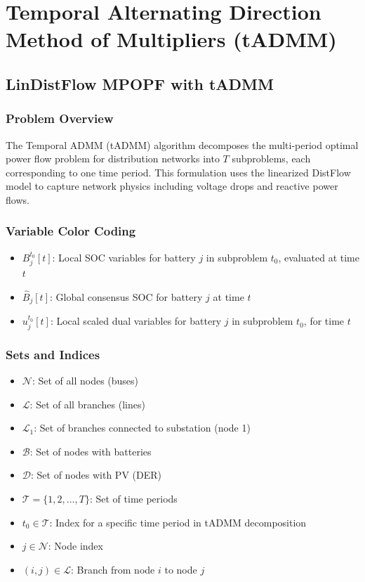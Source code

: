 \clearpage
\section{Temporal Alternating Direction Method of Multipliers (tADMM)}

\subsection{LinDistFlow MPOPF with tADMM}

\subsubsection{Problem Overview}

The Temporal ADMM (tADMM) algorithm decomposes the multi-period optimal power flow problem for distribution networks into $T$ subproblems, each corresponding to one time period. This formulation uses the linearized DistFlow model to capture network physics including voltage drops and reactive power flows.

\subsubsection{Variable Color Coding}
\begin{itemize}
    \item $B_j^{t_0}[t]$: Local SOC variables for battery $j$ in subproblem $t_0$, evaluated at time $t$
    \item $\hat{B}_j[t]$: Global consensus SOC for battery $j$ at time $t$
    \item $u_j^{t_0}[t]$: Local scaled dual variables for battery $j$ in subproblem $t_0$, for time $t$
\end{itemize}

\subsubsection{Sets and Indices}
\begin{itemize}
    \item $\mathcal{N}$: Set of all nodes (buses)
    \item $\mathcal{L}$: Set of all branches (lines)
    \item $\mathcal{L}_1$: Set of branches connected to substation (node 1)
    \item $\mathcal{B}$: Set of nodes with batteries
    \item $\mathcal{D}$: Set of nodes with PV (DER)
    \item $\mathcal{T} = \{1, 2, \ldots, T\}$: Set of time periods
    \item $t_0 \in \mathcal{T}$: Index for a specific time period in tADMM decomposition
    \item $j \in \mathcal{N}$: Node index
    \item $(i,j) \in \mathcal{L}$: Branch from node $i$ to node $j$
\end{itemize}

